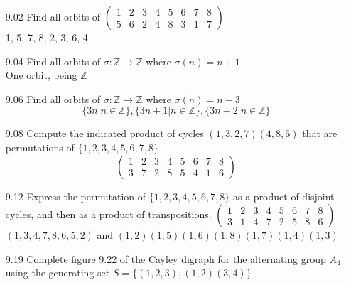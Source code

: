 \documentclass[12pt]{article}
\newcommand{\Z}{\mathds{Z}}
\begin{document}
\begin{enumerate}
	\item[9.02] Find all orbits of $ \begin{pmatrix}
	1 & 2 & 3 & 4 & 5 & 6 & 7 & 8 \\
	5 & 6 & 2 & 4 & 8 & 3 & 1 & 7 
	\end{pmatrix}  $ \\
	{1, 5, 7, 8}, {2, 3, 6}, {4} 
	
	\item[9.04] Find all orbits of $ \sigma : \Z \rightarrow \Z $ where $ \sigma(n) = n +1 $ \\
	One orbit, being $ \Z $
	\item[9.06] Find all orbits of $ \sigma : \Z \rightarrow \Z $ where $ \sigma(n) = n - 3 $
	\[\{3n|n\in\Z\},\{3n+1|n\in\Z\},\{3n+2|n\in\Z\}\]
	\item[9.08] Compute the indicated product of cycles $ (1,3,2,7)(4,8,6) $ that are permutations of $ \{1,2,3,4,5,6,7,8\} $ 
	\[\begin{pmatrix}
	1 & 2 & 3 & 4 & 5 & 6 & 7 & 8 \\
	3 & 7 & 2 & 8 & 5 & 4 & 1 & 6 
	\end{pmatrix}  \]
	\item[9.12] Express the permutation of $ \{1,2,3,4,5,6,7,8\} $  as a product of disjoint cycles, and then as a product of transpositions.  $ \begin{pmatrix}
	1 & 2 & 3 & 4 & 5 & 6 & 7 & 8 \\
	3 & 1 & 4 & 7 & 2 & 5 & 8 & 6 
	\end{pmatrix}  $\\
	$(1,3,4,7,8,6,5,2)$ and $ (1,2)(1,5)(1,6)(1,8)(1,7)(1,4)(1,3) $
	
	\item[9.19] Complete figure 9.22 of the Cayley digraph for the alternating group $ A_4 $ using the generating set $ S = \{(1,2,3),(1,2)(3,4)\} $
	\item[]
\end{enumerate}
\end{document}
